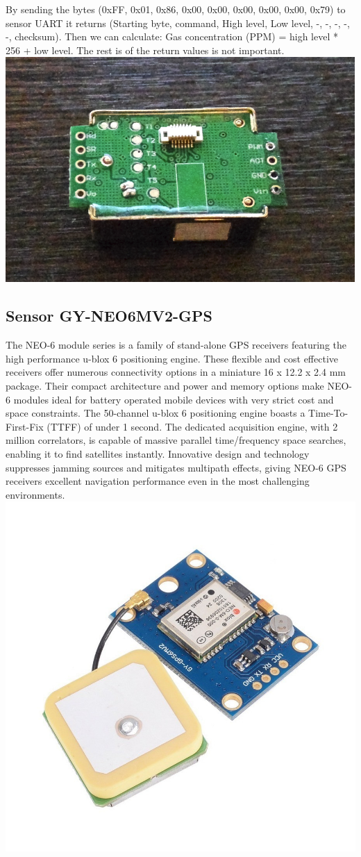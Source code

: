 By sending the bytes (0xFF, 0x01, 0x86, 0x00, 0x00, 0x00, 0x00, 0x00, 0x79) to sensor UART it returns
(Starting byte, command, High level, Low level, -, -, -, -, -, checksum).
Then we can calculate: Gas concentration (PPM) = high level * 256 + low level.
The rest is of the return values is not important.
\includegraphics[width=\linewidth]{MH-Z19}


\subsection{Sensor GY-NEO6MV2-GPS}
The NEO-6 module series is a family of stand-alone GPS receivers featuring the high performance u-blox 6
positioning engine. These flexible and cost effective receivers offer numerous connectivity options in a miniature
16 x 12.2 x 2.4 mm package. Their compact architecture and power and memory options make NEO-6 modules
ideal for battery operated mobile devices with very strict cost and space constraints.
The 50-channel u-blox 6 positioning engine boasts a Time-To-First-Fix (TTFF) of under 1 second. The dedicated
acquisition engine, with 2 million correlators, is capable of massive parallel time/frequency space searches,
enabling it to find satellites instantly. Innovative design and technology suppresses jamming sources and
mitigates multipath effects, giving NEO-6 GPS receivers excellent navigation performance even in the most
challenging environments.
\includegraphics[width=0.5\linewidth]{GY-NEO6MV2-GPS}
